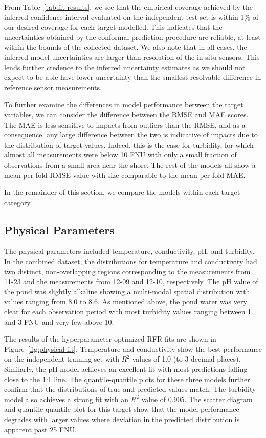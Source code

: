 \documentclass[sensors,article,submit,pdftex,moreauthors]{Definitions/mdpi}
\begin{document}
From Table~\ref{tab:fit-results},  we see that the empirical coverage achieved by the inferred confidence interval evaluated on the independent test set is within 1\% of our desired coverage for each target modelled. This indicates that the uncertainties obtained by the conformal prediction procedure are reliable, at least within the bounds of the collected dataset. We also note that in all cases, the inferred model uncertainties are larger than resolution of the in-situ sensors. This lends further credence to the inferred uncertainty estimates as we should not expect to be able have lower uncertainty than the smallest resolvable difference in reference sensor measurements.

To further examine the differences in model performance between the target variables, we can consider the difference between the RMSE and MAE scores. The MAE is less sensitive to impacts from outliers than the RMSE, and as a consequence, any large difference between the two is indicative of impacts due to the distribution of target values. Indeed, this is the case for turbidity, for which almost all measurements were below 10 FNU with only a small fraction of observations from a small area near the shore. The rest of the models all show a mean per-fold RMSE value with size comparable to the mean per-fold MAE. 

In the remainder of this section, we compare the models within each target category.

\subsection{Physical Parameters}

The physical parameters included temperature, conductivity, pH, and turbidity. In the combined dataset, the distributions for temperature and conductivity had two distinct, non-overlapping regions corresponding to the measurements from 11-23 and the measurements from 12-09 and 12-10, respectively. The pH value of the pond was slightly alkaline showing a multi-modal spatial distribution with values ranging from 8.0 to 8.6. As mentioned above, the pond water was very clear for each observation period with most turbidity values ranging between 1 and 3 FNU and very few above 10.

The results of the hyperparameter optimized RFR fits are shown in Figure~\ref{fig:physical-fit}. Temperature and conductivity show the best performance on the independent training set with $R^2$ values of 1.0 (to 3 decimal places). Similarly, the pH model achieves an excellent fit with most predictions falling close to the 1:1 line. The quantile-quantile plots for these three models further confirm that the distributions of true and predicted values match. The turbidity model also achieves a strong fit with an $R^2$ value of 0.905. The scatter diagram and quantile-quantile plot for this target show that the model performance degrades with larger values where deviation in the predicted distribution is apparent past 25 FNU.
\end{document}
